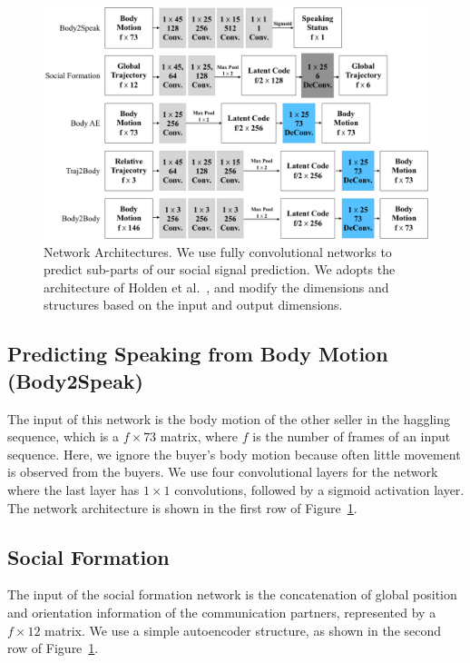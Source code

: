 \begin{figure}[t]	
	\includegraphics[width=\textwidth]{ssp_fig/networks}
	\caption{Network Architectures. We use fully convolutional networks to predict sub-parts of our social signal prediction. We adopts the architecture of Holden et al.~\cite{holden2016deep}, and modify the dimensions and structures based on the input and output dimensions. }
	\label{fig:architectures}
\end{figure}



\subsection{Predicting Speaking from Body Motion (Body2Speak)}
\label{section:body2speak}
The input of this network is the body motion of the other seller in the haggling sequence, which is a $f \times 73$ matrix, where $f$ is the number of frames of an input sequence. Here, we ignore the buyer's body motion because often little movement is observed from the buyers.  We use four convolutional layers for the network where the last layer has $1\times1$ convolutions, followed by a sigmoid activation layer. The network architecture is shown in the first row of Figure~\ref{fig:architectures}.


\subsection{Social Formation}
The input of the social formation network is the concatenation of global position and orientation information of the communication partners, represented by a $f \times 12$ matrix.  We use a simple autoencoder structure, as shown in the second row of Figure~\ref{fig:architectures}.

